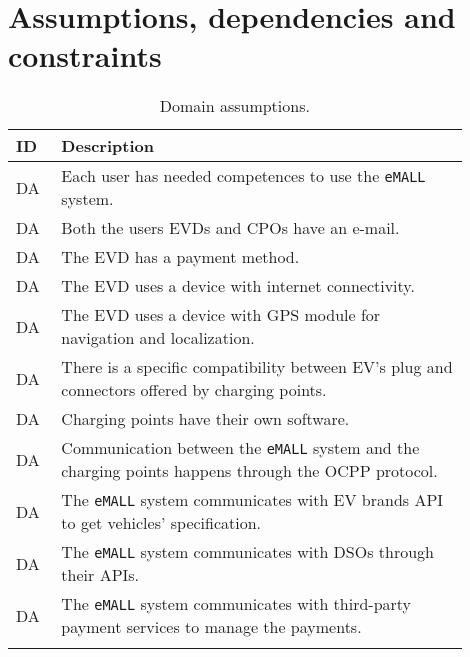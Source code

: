\section{Assumptions, dependencies and constraints}
\label{sec:assumptions_dependencies_and_constraints}%
\setcounter{da}{1}
\newcommand{\cda}{\theda\stepcounter{da}}
\begin{center}
    \begin{longtable}{ |l|p{0.9\linewidth}| }
        \hline
        \textbf{ID} & \textbf{Description}                                                                                     \\
        \hline
        DA\cda      & Each user has needed competences to use the \verb|eMALL| system.                                         \\
        \hline
        DA\cda      & Both the users EVDs and CPOs have an e-mail.                                                             \\
        \hline
        DA\cda      & The EVD has a payment method.                                                                            \\
        \hline
        DA\cda      & The EVD uses a device with internet connectivity.                                                        \\
        \hline
        DA\cda      & The EVD uses a device with GPS module for navigation and localization.                                   \\
        \hline
        DA\cda      & There is a specific compatibility between EV's plug and connectors offered by charging points.           \\
        \hline
        DA\cda      & Charging points have their own software.                                                                 \\
        \hline
        DA\cda      & Communication between the \verb|eMALL| system and the charging points happens through the OCPP protocol. \\
        \hline
        DA\cda      & The \verb|eMALL| system communicates with EV brands API to get vehicles' specification.                  \\
        \hline
        DA\cda      & The \verb|eMALL| system communicates with DSOs through their APIs.                                       \\
        \hline
        DA\cda      & The \verb|eMALL| system communicates with third-party payment services to manage the payments.           \\
        \hline
        \caption{Domain assumptions.}
        \label{tab:domainassmptn_tab}%
    \end{longtable}
\end{center}
